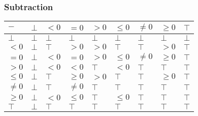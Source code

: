 \documentclass{beamer}
\begin{document}
\begin{frame}
    \frametitle{Subtraction}
    \begin{table}[]
        \begin{tabular}{|l|l|l|l|l|l|l|l|l|}
        \hline
        $-$     & $\bot$ & $<0$   & $=0$    & $>0$   & $\le 0$ & $\ne 0$ & $\ge 0$ & $\top$ \\ \hline
        $\bot$  & $\bot$ & $\bot$ & $\bot$  & $\bot$ & $\bot$  & $\bot$  & $\bot$  & $\bot$ \\ \hline
        $<0$    & $\bot$ & $\top$ & $>0$    & $>0$   & $\top$  & $\top$  & $>0$    & $\top$ \\ \hline
        $=0$    & $\bot$ & $<0$   & $=0$    & $>0$   & $\le 0$ & $\ne 0$ & $\ge 0$ & $\top$ \\ \hline
        $>0$    & $\bot$ & $<0$   & $<0$    & $\top$ & $<0$    & $\top$  & $\top$  & $\top$ \\ \hline
        $\le 0$ & $\bot$ & $\top$ & $\ge 0$ & $>0$   & $\top$  & $\top$  & $\ge 0$ & $\top$ \\ \hline
        $\ne 0$ & $\bot$ & $\top$ & $\ne 0$ & $\top$ & $\top$  & $\top$  & $\top$  & $\top$ \\ \hline
        $\ge 0$ & $\bot$ & $<0$   & $\le 0$ & $\top$ & $\le 0$ & $\top$  & $\top$  & $\top$ \\ \hline
        $\top$  & $\bot$ & $\top$ & $\top$  & $\top$ & $\top$  & $\top$  & $\top$  & $\top$ \\ \hline
        \end{tabular}
        \end{table}
    \end{frame}
\end{document}
